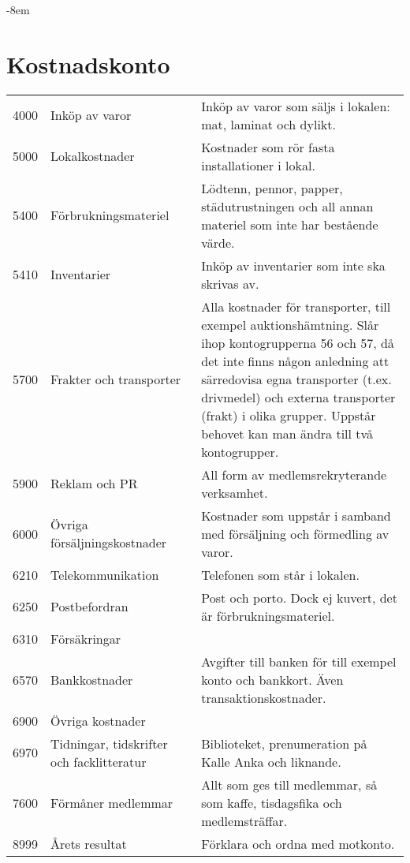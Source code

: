 		\clearpage
		\begin{adjustwidth}{}{-8em}
			\section{Kostnadskonto}
			\label{sec:kontoplan:kostnad}
			\begin{xtabular}[l]{l p{0.4\linewidth} p{0.6\linewidth}}
				4000 & Inköp av varor & Inköp av varor som säljs i lokalen: mat, laminat och dylikt. \\
				5000 & Lokalkostnader & Kostnader som rör fasta installationer i lokal. \\
				5400 & Förbrukningsmateriel & Lödtenn, pennor, papper, städutrustningen och all annan materiel som inte har bestående värde. \\
				5410 & Inventarier & Inköp av inventarier som inte ska skrivas av. \\
				5700 & Frakter och transporter & Alla kostnader för transporter, till exempel auktionshämtning. Slår ihop kontogrupperna 56 och 57, då det inte finns någon anledning att särredovisa egna transporter (t.ex. drivmedel) och externa transporter (frakt) i olika grupper. Uppstår behovet kan man ändra till två kontogrupper. \\
				5900 & Reklam och PR & All form av medlemsrekryterande verksamhet. \\
				6000 & Övriga försäljningskostnader & Kostnader som uppstår i samband med försäljning och förmedling av varor. \\
				6210 & Telekommunikation & Telefonen som står i lokalen. \\
				6250 & Postbefordran & Post och porto. Dock ej kuvert, det är förbrukningsmateriel. \\
				6310 & Försäkringar &  \\
				6570 & Bankkostnader & Avgifter till banken för till exempel konto och bankkort. Även transaktionskostnader. \\
				6900 & Övriga kostnader &  \\
				6970 & Tidningar, tidskrifter och facklitteratur & Biblioteket, prenumeration på Kalle Anka och liknande. \\
				7600 & Förmåner medlemmar & Allt som ges till medlemmar, så som kaffe, tisdagsfika och medlemsträffar. \\
				8999 & Årets resultat & Förklara och ordna med motkonto. \\
				
			\end{xtabular}
		\end{adjustwidth}

	